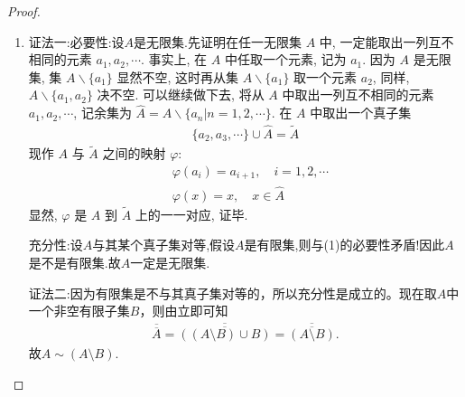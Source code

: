 \documentclass[../../main.tex]{subfiles}%
\begin{document}
\begin{proof}
\begin{enumerate}[(1)]
\item {\color{blue}证法一:}{\heiti 必要性:}设$A$是无限集.先证明在任一无限集 $A$ 中, 一定能取出一列互不相同的元素 $a_1, a_2, \cdots$. 事实上, 在 $A$ 中任取一个元素, 记为 $a_1$. 因为 $A$ 是无限集, 集 $A\backslash  \{a_1\}$ 显然不空, 这时再从集 $A\backslash  \{a_1\}$ 取一个元素 $a_2$, 同样, $A\backslash  \{a_1, a_2\}$ 决不空. 可以继续做下去, 将从 $A$ 中取出一列互不相同的元素 $a_1, a_2, \cdots$, 记余集为 $\hat{A} = A\backslash  \{a_n | n = 1, 2, \cdots\}$. 在 $A$ 中取出一个真子集
\begin{align*}
\{a_2, a_3, \cdots\} \cup \hat{A} = \tilde{A}
\end{align*}
现作 $A$ 与 $\tilde{A}$ 之间的映射 $\varphi$:
\begin{align*}
&\varphi(a_i) = a_{i + 1}, \quad i = 1, 2, \cdots\\
&\varphi(x) = x, \quad x \in \hat{A}
\end{align*}
显然, $\varphi$ 是 $A$ 到 $\tilde{A}$ 上的一一对应, 证毕. 

{\heiti 充分性:}设$A$与其某个真子集对等,假设$A$是有限集,则与(1)的必要性矛盾!因此$A$是不是有限集.故$A$一定是无限集.

{\color{blue}证法二:}因为有限集是不与其真子集对等的，所以充分性是成立的。现在取\(A\)中一个非空有限子集\(B\)，则由立即可知
\begin{align*}
\overline{\overline{A}}=\overline{\overline{\left( \left( A\setminus B \right) \cup B \right) }}=\overline{\overline{\left( A\setminus B \right) }}.
\end{align*}
故$A\sim \left( A\setminus B \right) $.
\end{enumerate}

\end{proof}
\end{document}
